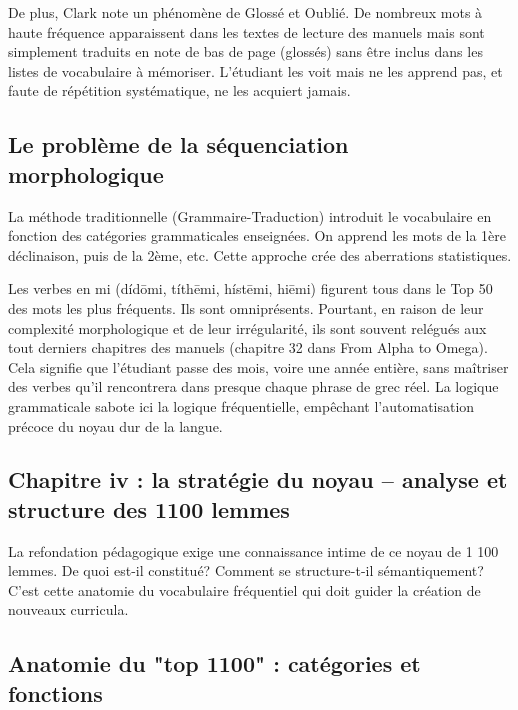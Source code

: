 {De plus, Clark note un phénomène de \og Glossé et Oublié\fg{}. De nombreux mots à haute fréquence
apparaissent dans les textes de lecture des manuels mais sont simplement traduits en note de bas de
page (glossés) sans être inclus dans les listes de vocabulaire à mémoriser. L'étudiant les \og
voit\fg{} mais ne les \og apprend\fg{} pas, et faute de répétition systématique, ne les acquiert
jamais.\cite{III-1-1-ref46}



\subsection{Le problème de la séquenciation morphologique}

La méthode traditionnelle (Grammaire-Traduction) introduit le vocabulaire en fonction des catégories
grammaticales enseignées. On apprend les mots de la 1ère déclinaison, puis de la 2ème, etc. Cette
approche crée des aberrations statistiques.

Les verbes en \-mi (dídōmi, títhēmi, hístēmi, hiēmi) figurent tous dans le Top 50 des mots les plus
fréquents.\cite{III-1-1-ref11} Ils sont omniprésents. Pourtant, en raison de leur complexité
morphologique et de leur irrégularité, ils sont souvent relégués aux tout derniers chapitres des
manuels (chapitre 32 dans From Alpha to Omega). Cela signifie que l'étudiant passe des mois, voire
une année entière, sans maîtriser des verbes qu'il rencontrera dans presque chaque phrase de grec
réel. La logique grammaticale sabote ici la logique fréquentielle, empêchant l'automatisation
précoce du noyau dur de la langue.\cite{III-1-1-ref47}



\subsection{Chapitre iv : la stratégie du noyau – analyse et structure des 1100 lemmes}

La refondation pédagogique exige une connaissance intime de ce noyau de 1 100 lemmes. De quoi est-il
constitué? Comment se structure-t-il sémantiquement? C'est cette \og anatomie\fg{} du vocabulaire
fréquentiel qui doit guider la création de nouveaux curricula.



\subsection{Anatomie du "top 1100" : catégories et fonctions}

}
